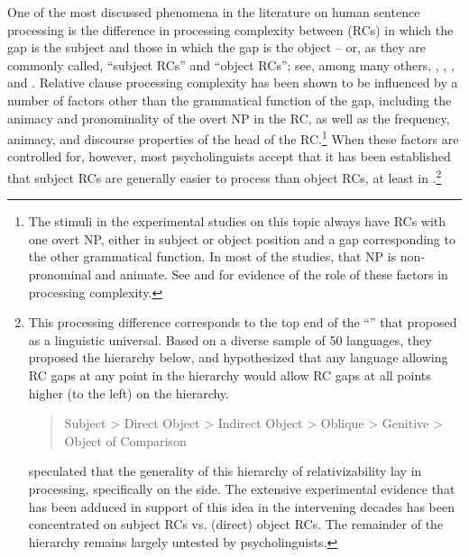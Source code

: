 \documentclass[output=paper
	        ,collection
	        ,collectionchapter
 	        ,biblatex
                ,babelshorthands
                ,newtxmath
                ,draftmode
                ,colorlinks, citecolor=brown
]{langscibook}
\begin{document}
One of the most discussed phenomena in the literature on human sentence processing is the difference in processing complexity between  (RCs) in which the gap is the subject and those in which the gap is the object -- or, as they are commonly called, ``subject RCs'' and ``object RCs''; see, among many others, \citet{WannerMaratsos78}, \citet{Gibson98a}, \citet{TraxlerEtal2002}, and \citet{GennariMacDonald2008}.  Relative clause processing complexity has been shown to be influenced by a number of factors other than the grammatical function of the gap, including the animacy and pronominality of the overt NP in the RC, as well as the frequency, animacy, and discourse properties of the head of the RC.\footnote{The stimuli in the experimental studies on this topic always have RCs with one overt NP, either in subject or object position and a gap corresponding to the other grammatical function. In most of the studies, that NP is non-pronominal and animate.  See \citet{RealiChristiansen07} and \citet{RolandEtal2012} for evidence of the role of these factors in processing complexity.} When these factors are controlled for, however, most psycholinguists accept that it has been established that subject RCs are generally easier to process than object RCs, at least in .\footnote{This processing difference corresponds to the top end of the ``'' that \citet{KC77a} proposed as a linguistic universal. Based on a diverse sample of 50 languages, they proposed the hierarchy below, and hypothesized that any language allowing RC gaps at any point in the hierarchy would allow RC gaps at all points higher (to the left) on the hierarchy.
\begin{quote}

Subject 
> 
Direct Object 
> 
Indirect Object 
> 
Oblique 
> 
Genitive
> 
Object of Comparison
\end{quote}
\citeauthor{KC77a} speculated that the generality of this hierarchy of relativizability lay in processing, specifically on the  side.  The extensive experimental evidence that has been adduced in support of this idea in the intervening decades has been concentrated on subject RCs vs. (direct) object RCs.  The remainder of the hierarchy remains largely untested by psycholinguists.}
\end{document}
